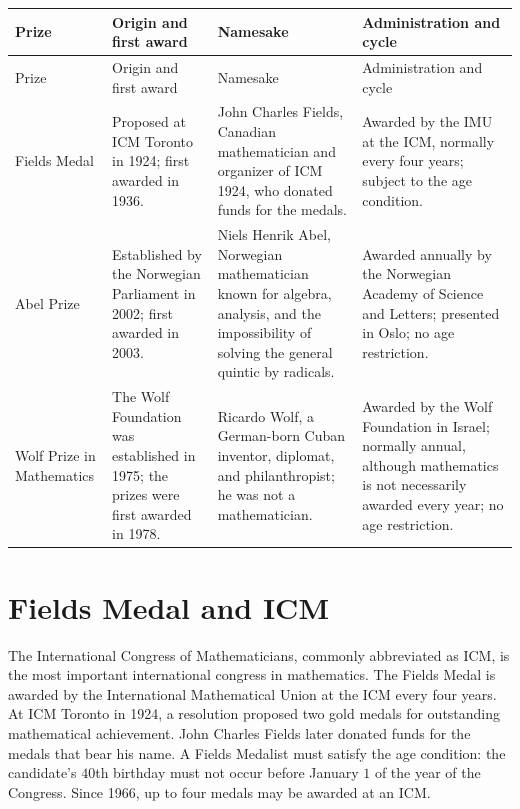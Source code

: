     {\small
    \renewcommand{\arraystretch}{1.18}
    \begin{longtable}{@{}L{0.16\textwidth}L{0.20\textwidth}L{0.27\textwidth}L{0.29\textwidth}@{}}
        \toprule
        Prize & Origin and first award & Namesake & Administration and cycle \\
        \midrule
        \endfirsthead

        \toprule
        Prize & Origin and first award & Namesake & Administration and cycle \\
        \midrule
        \endhead

        \bottomrule
        \endlastfoot

        Fields Medal
        & Proposed at ICM Toronto in 1924; first awarded in 1936.
        & John Charles Fields, Canadian mathematician and organizer of ICM 1924,
          who donated funds for the medals.
        & Awarded by the IMU at the ICM, normally every four years; subject to
          the age condition. \\

        Abel Prize
        & Established by the Norwegian Parliament in 2002; first awarded in
          2003.
        & Niels Henrik Abel, Norwegian mathematician known for algebra,
          analysis, and the impossibility of solving the general quintic by
          radicals.
        & Awarded annually by the Norwegian Academy of Science and Letters;
          presented in Oslo; no age restriction. \\

        Wolf Prize in Mathematics
        & The Wolf Foundation was established in 1975; the prizes were first
          awarded in 1978.
        & Ricardo Wolf, a German-born Cuban inventor, diplomat, and
          philanthropist; he was not a mathematician.
        & Awarded by the Wolf Foundation in Israel; normally annual, although
          mathematics is not necessarily awarded every year; no age
          restriction. \\
    \end{longtable}
    }

    \section*{Fields Medal and ICM}

    The International Congress of Mathematicians, commonly abbreviated as ICM,
    is the most important international congress in mathematics. The Fields
    Medal is awarded by the International Mathematical Union at the ICM every
    four years. At ICM Toronto in 1924, a resolution proposed two gold medals
    for outstanding mathematical achievement. John Charles Fields later
    donated funds for the medals that bear his name. A Fields Medalist must
    satisfy the age condition: the candidate's $40$th birthday must not occur
    before January $1$ of the year of the Congress. Since 1966, up to four
    medals may be awarded at an ICM.

